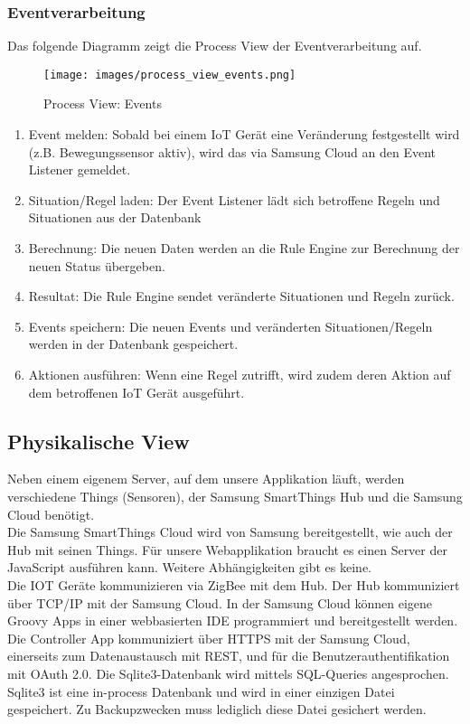 \subsubsection{Eventverarbeitung}
Das folgende Diagramm zeigt die Process View der Eventverarbeitung auf.
%
\begin{figure}[ht]
  \begin{center}
    \texttt{[image: images/process\_view\_events.png]}
    \caption[Process View]{Process View: Events}
    \label{fig:process_view_events}
  \end{center}
\end{figure}
%
\begin{enumerate}
\item Event melden: Sobald bei einem IoT Gerät eine Veränderung festgestellt wird (z.B. Bewegungssensor aktiv), wird das via Samsung Cloud an den Event Listener gemeldet.
\item Situation/Regel laden: Der Event Listener lädt sich betroffene Regeln und Situationen aus der Datenbank
\item Berechnung: Die neuen Daten werden an die Rule Engine zur Berechnung der neuen Status übergeben.
\item Resultat: Die Rule Engine sendet veränderte Situationen und Regeln zurück.
\item Events speichern: Die neuen Events und veränderten Situationen/Regeln werden in der Datenbank gespeichert.
\item Aktionen ausführen: Wenn eine Regel zutrifft, wird zudem deren Aktion auf dem betroffenen IoT Gerät ausgeführt.
\end{enumerate}
%
\clearpage
%
\subsection{Physikalische View}
Neben einem eigenem Server, auf dem unsere Applikation läuft, werden verschiedene Things (Sensoren), der Samsung SmartThings Hub und die Samsung Cloud benötigt.\\
%
Die Samsung SmartThings Cloud wird von Samsung bereitgestellt, wie auch der Hub mit seinen Things. Für unsere
Webapplikation braucht es einen Server der JavaScript ausführen kann. Weitere Abhängigkeiten gibt es keine.\\[2ex]
%
Die IOT Geräte kommunizieren via ZigBee mit dem Hub. Der Hub kommuniziert über TCP/IP mit der Samsung Cloud. In der Samsung Cloud können eigene Groovy Apps in einer webbasierten IDE programmiert und bereitgestellt werden. Die Controller App kommuniziert über HTTPS mit der Samsung Cloud, einerseits zum Datenaustausch mit REST, und für die Benutzerauthentifikation mit OAuth 2.0. Die Sqlite3-Datenbank wird mittels SQL-Queries angesprochen. Sqlite3 ist eine in-process Datenbank und wird in einer einzigen Datei gespeichert. Zu Backupzwecken muss lediglich diese Datei gesichert werden.


